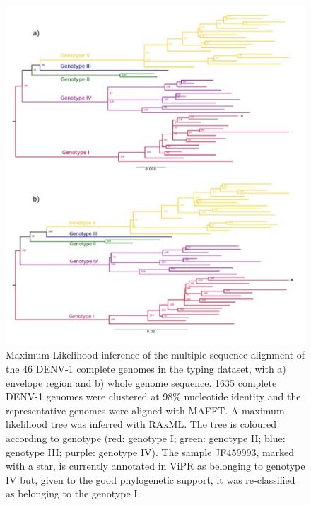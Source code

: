 \begin{figure}[h!]
\centering
\includegraphics[width=\textwidth]{figures/chapter 4/Figure S5.pdf}
\caption{Maximum Likelihood inference of the multiple sequence alignment of the 46 DENV-1 complete genomes in the typing dataset, with a) envelope region and b) whole genome sequence. 1635 complete DENV-1 genomes were clustered at 98\% nucleotide identity and the representative genomes were aligned with MAFFT. A maximum likelihood tree was inferred with RAxML. The tree is coloured according to genotype (red: genotype I; green: genotype II; blue: genotype III; purple: genotype IV). The sample JF459993, marked with a star, is currently annotated in ViPR as belonging to genotype IV but, given to the good phylogenetic support, it was re-classified as belonging to the genotype I.}
\label{fig:chap4_figure_sup5}
\end{figure}

